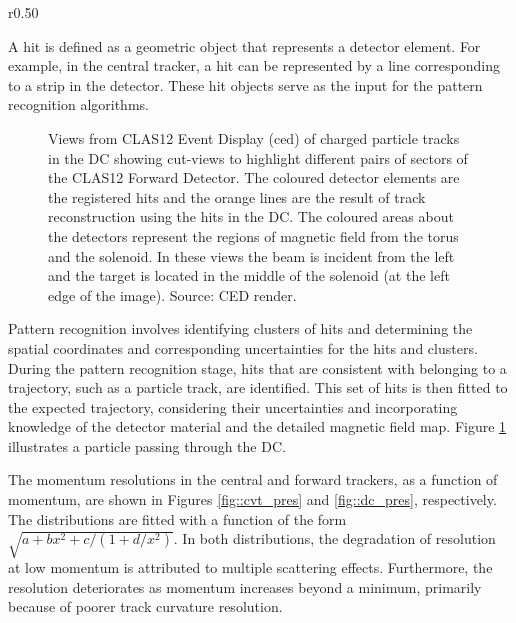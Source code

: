    \begin{wrapfigure}{r}{0.50\textwidth}
        \centering{}
        \caption[DC momentum resolution vs momentum.]{Momentum resolution vs. momentum in the DC evaluated using pions simulated at $\theta = 15\degree \pm 5\degree$ and at $\phi = 0 \pm 5\degree$ without background.
        Source: \cite{ziegler2020}.}
        \label{fig::dc_pres}
    \end{wrapfigure}

    A hit is defined as a geometric object that represents a detector element.
    For example, in the central tracker, a hit can be represented by a line corresponding to a strip in the detector.
    These hit objects serve as the input for the pattern recognition algorithms.

    \begin{figure}[t]
        \centering{}
        \caption[Particle going through DC.]{Views from CLAS12 Event Display (ced) of charged particle tracks in the DC showing cut-views to highlight different pairs of sectors of the CLAS12 Forward Detector.
        The coloured detector elements are the registered hits and the orange lines are the result of track reconstruction using the hits in the DC.
        The coloured areas about the detectors represent the regions of magnetic field from the torus and the solenoid.
        In these views the beam is incident from the left and the target is located in the middle of the solenoid (at the left edge of the image).
        Source: CED render.}
        \label{fig::ced_event}
    \end{figure}
    Pattern recognition involves identifying clusters of hits and determining the spatial coordinates and corresponding uncertainties for the hits and clusters.
    During the pattern recognition stage, hits that are consistent with belonging to a trajectory, such as a particle track, are identified.
    This set of hits is then fitted to the expected trajectory, considering their uncertainties and incorporating knowledge of the detector material and the detailed magnetic field map.
    Figure \ref{fig::ced_event} illustrates a particle passing through the DC.

    The momentum resolutions in the central and forward trackers, as a function of momentum, are shown in Figures \ref{fig::cvt_pres} and \ref{fig::dc_pres}, respectively.
    The distributions are fitted with a function of the form $\sqrt{a + bx^2 + c/(1 + d/x^2)}$.
    In both distributions, the degradation of resolution at low momentum is attributed to multiple scattering effects.
    Furthermore, the resolution deteriorates as momentum increases beyond a minimum, primarily because of poorer track curvature resolution.

